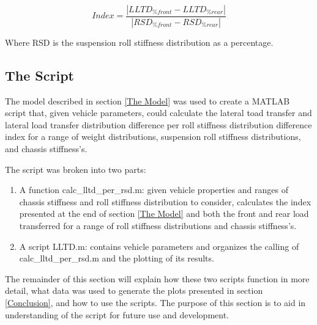 \documentclass[a4paper]{article}
\numberwithin{equation}{section}
\begin{document}
\begin{equation}
Index=\frac{|LLTD_{\%front}-LLTD_{\%rear}|}{|RSD_{\%front}-RSD_{\%rear}|}
\label{equ: chassis index}
\end{equation}

Where RSD is the suspension roll stiffness distribution as a percentage.

\subsection{The Script} \label{The Script}
The model described in section \ref{The Model} was used to create a MATLAB script that, given vehicle parameters, could calculate the lateral toad transfer and lateral load transfer distribution difference per roll stiffness distribution difference index for a range of weight distributions, suspension roll stiffness distributions, and chassis stiffness’s.

The script was broken into two parts:
\begin{enumerate}
	\item A function calc\_lltd\_per\_rsd.m: given vehicle properties and ranges of chassis stiffness and roll stiffness distribution to consider, calculates the index presented at the end of section \ref{The Model} and both the front and rear load transferred for a range of roll stiffness distributions and chassis stiffness’s.
	\item A script LLTD.m: contains vehicle parameters and organizes the calling of calc\_lltd\_per\_rsd.m and the plotting of its results.
\end{enumerate}

The remainder of this section will explain how these two scripts function in more detail, what data was used to generate the plots presented in section \ref{Conclusion}, and how to use the scripts. The purpose of this section is to aid in understanding of the script for future use and development.
\end{document}
